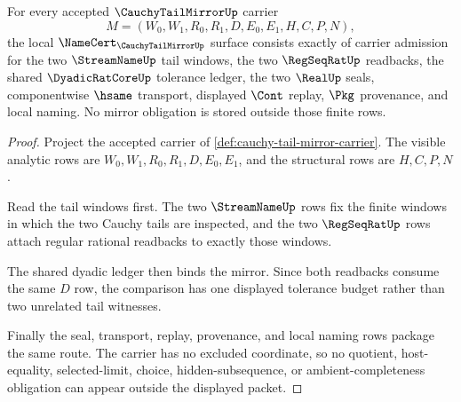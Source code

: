 \begin{theorem}
\label{thm:cauchy-tail-mirror-namecert-obligations}
For every accepted $\CauchyTailMirrorUp$ carrier
$$
M=(W_0,W_1,R_0,R_1,D,E_0,E_1,H,C,P,N),
$$
the local $\NameCert_{\CauchyTailMirrorUp}$ surface consists exactly of carrier admission for the two $\StreamNameUp$ tail windows, the two $\RegSeqRatUp$ readbacks, the shared $\DyadicRatCoreUp$ tolerance ledger, the two $\RealUp$ seals, componentwise $\hsame$ transport, displayed $\Cont$ replay, $\Pkg$ provenance, and local naming. No mirror obligation is stored outside those finite rows.
\end{theorem}
\begin{proof}
Project the accepted carrier of \autoref{def:cauchy-tail-mirror-carrier}. The visible analytic rows are $W_0,W_1,R_0,R_1,D,E_0,E_1$, and the structural rows are $H,C,P,N$.

Read the tail windows first. The two $\StreamNameUp$ rows fix the finite windows in which the two Cauchy tails are inspected, and the two $\RegSeqRatUp$ rows attach regular rational readbacks to exactly those windows.

The shared dyadic ledger then binds the mirror. Since both readbacks consume the same $D$ row, the comparison has one displayed tolerance budget rather than two unrelated tail witnesses.

Finally the seal, transport, replay, provenance, and local naming rows package the same route. The carrier has no excluded coordinate, so no quotient, host-equality, selected-limit, choice, hidden-subsequence, or ambient-completeness obligation can appear outside the displayed packet.
\end{proof}

